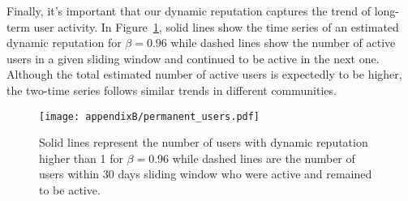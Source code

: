 Finally, it's important that our dynamic reputation captures the trend of long-term user activity. In Figure~\ref{fig:active-users}, solid lines show the time series of an estimated dynamic reputation for $\beta = 0.96$ while dashed lines show the number of active users in a given sliding window and continued to be active in the next one. Although the total estimated number of active users is expectedly to be higher, the two-time series follows similar trends in different communities.

\begin{figure}[H]
	\centering
	\texttt{[image: appendixB/permanent\_users.pdf]}
	\caption[Number of users in Stack Exchange community who remain to be active.]{Solid lines represent the number of users with dynamic reputation higher than 1 for $\beta=0.96$ while dashed lines are the number of users within 30 days sliding window who were active and remained to be active.}
	\label{fig:active-users}
\end{figure}

\clearpage
